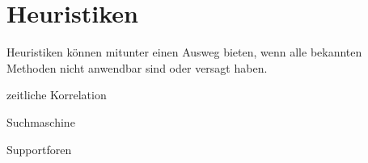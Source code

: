 \chapter{Heuristiken}
\label{cha:heuristiken}

\begin{abstractsec}
  Heuristiken können mitunter einen Ausweg bieten, wenn alle bekannten
  Methoden nicht anwendbar sind oder versagt haben.
\end{abstractsec}

\begin{notes}
\item zeitliche Korrelation
\item Suchmaschine
\item Supportforen
\end{notes}








